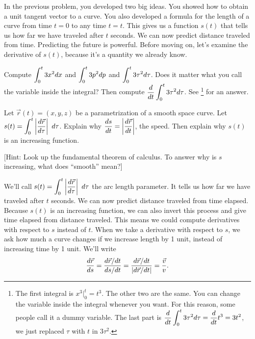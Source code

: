 In the previous problem, you developed two big ideas.  You showed how to obtain a unit tangent vector to a curve. You also developed a formula for the length of a curve from time $t=0$ to any time $t=t$.  This gives us a function $s(t)$ that tells us how far we have traveled after $t$ seconds. We can now predict distance traveled from time. Predicting the future is powerful. Before moving on, let's examine the derivative of $s(t)$, because it's a quantity we already know.

\begin{review*}
 Compute $\displaystyle \int_0^t 3x^2 dx$ and $\displaystyle \int_0^t 3p^2 dp$ and $\displaystyle \int_0^t 3\tau^2 d\tau$. 
 Does it matter what you call the variable inside the integral? 
 Then compute $\displaystyle\frac{d}{dt} \int_0^t 3\tau^2 d\tau$. See 
\footnote{
The first integral is $x^3|_0^t = t^3$. The other two are the same. You can change the variable inside the integral whenever you want.  For this reason, some people call it a dummy variable. 
The last part is $\displaystyle\frac{d}{dt} \int_0^t 3\tau^2 d\tau = \frac{d}{dt} t^3 = 3t^2$, 
we just replaced $\tau$ with $t$ in $3\tau^2$.}
for an answer. 
\end{review*}


\begin{problem}\label{fundamental theorem of calculus as it applies to arc length parameter}%
 Let $\vec r(t)=(x,y,z)$ be a parametrization of a smooth space curve. Let $\displaystyle s(t)=\int_0^t \left|\frac {d\vec r}{d\tau} \right|\ d\tau$.  Explain why $\displaystyle\frac{ds}{dt} = \left|\frac {d\vec r}{dt} \right|$, the speed. Then explain why $s(t)$ is an increasing function.

 [Hint: Look up the fundamental theorem of calculus. To answer why is $s$ increasing, what does ``smooth'' mean?] 
\end{problem}

We'll call $\displaystyle s(t)=\int_0^t \left|\frac {d\vec r}{d\tau}\right|\ d\tau$ the arc length parameter.  It tells us how far we have traveled after $t$ seconds. We can now predict distance traveled from time elapsed. Because $s(t)$ is an increasing function, we can also invert this process and give time elapsed from distance traveled. This means we could compute derivatives with respect to $s$ instead of $t$.  
When we take a derivative with respect to $s$, we ask how much a curve changes if we increase length by 1 unit, instead of increasing time by 1 unit.  We'll write
$$\displaystyle\frac{d\vec r}{ds} =\displaystyle\frac{d\vec r/dt}{ds/dt} = \frac{d\vec r/dt}{|d\vec r/dt|} = \frac{\vec v}{v}.$$

